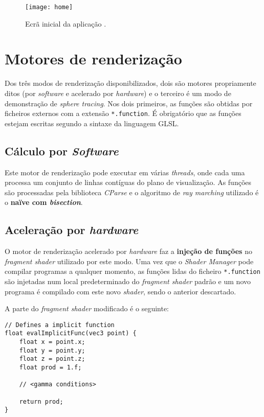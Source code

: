 \begin{figure}[!tbp]
	\centering
	\texttt{[image: home]}
	\caption[Ecrã inicial da aplicação]{Ecrã inicial da aplicação \theapp.}
	\label{fig::home}
\end{figure}


\section{Motores de renderização}
\label{sec::impl:motor}

Dos três modos de renderização disponibilizados, dois são motores propriamente ditos (por \textit{software} e acelerado por \textit{hardware}) e o terceiro é um modo de demonstração de \textit{sphere tracing}. Nos dois primeiros, as funções são obtidas por ficheiros externos com a extensão \verb|*.function|. É obrigatório que as funções estejam escritas segundo a sintaxe da linguagem \ac{GLSL}.


\subsection{Cálculo por \textit{Software}}
\label{ssec::impl:motor:cpu}

Este motor de renderização pode executar em várias \textit{threads}, onde cada uma processa um conjunto de linhas contíguas do plano de visualização. As funções são processadas pela biblioteca \textit{CParse} e o algoritmo de \textit{ray marching} utilizado é o \textbf{naïve com \textit{bisection}}.


\subsection{Aceleração por \textit{hardware}}
\label{ssec::impl:motor:gpu}

O motor de renderização acelerado por \textit{hardware} faz a \textbf{injeção de funções} no \textit{fragment shader} utilizado por este modo. Uma vez que o \textit{Shader Manager} pode compilar programas a qualquer momento, as funções lidas do ficheiro \verb|*.function| são injetadas num local predeterminado do \textit{fragment shader} padrão e um novo programa é compilado com este novo \textit{shader}, sendo o anterior descartado.

A parte do \textit{fragment shader} modificado é o seguinte:

\begin{verbatim}
// Defines a implicit function
float evalImplicitFunc(vec3 point) {
    float x = point.x;
    float y = point.y;
    float z = point.z;
    float prod = 1.f;

    // <gamma conditions>

    return prod;
}
\end{verbatim}

